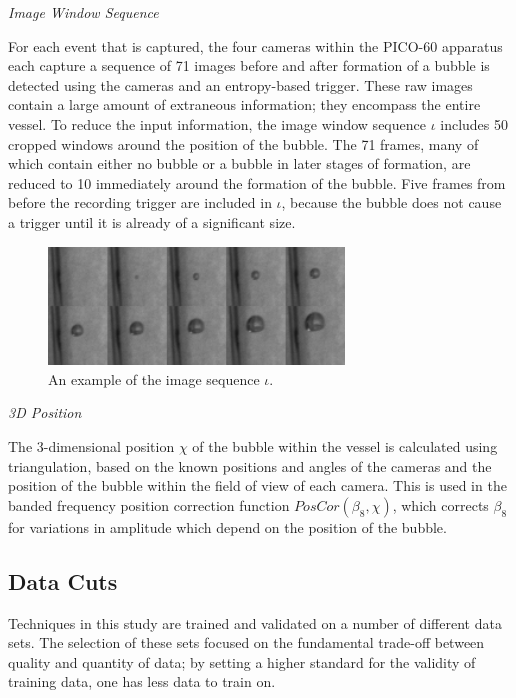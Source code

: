 \documentclass[10pt]{article}
\begin{document}
\textit{Image Window Sequence}

For each event that is captured, the four cameras within the PICO-60 apparatus each capture a sequence of 71 images before and after formation of a bubble is detected using the cameras and an entropy-based trigger. These raw images contain a large amount of extraneous information; they encompass the entire vessel. To reduce the input information, the image window sequence $\iota$ includes 50 cropped windows around the position of the bubble. The 71 frames, many of which contain either no bubble or a bubble in later stages of formation, are reduced to 10 immediately around the formation of the bubble. Five frames from before the recording trigger are included in $\iota$, because the bubble does not cause a trigger until it is already of a significant size.

\begin{figure}[h]
    \centering
    \includegraphics[width=0.7\textwidth]{image_grid}
    \caption{\label{} An example of the image sequence $\iota$.}
\end{figure}

\textit{3D Position}

The 3-dimensional position $\chi$ of the bubble within the vessel is calculated using triangulation, based on the known positions and angles of the cameras and the position of the bubble within the field of view of each camera. This is used in the banded frequency position correction function $PosCor(\beta _{8}, \chi)$, which corrects $\beta _{8}$ for variations in amplitude which depend on the position of the bubble.

\subsection{Data Cuts}

Techniques in this study are trained and validated on a number of different data sets. The selection of these sets focused on the fundamental trade-off between quality and quantity of data; by setting a higher standard for the validity of training data, one has less data to train on.
\end{document}
